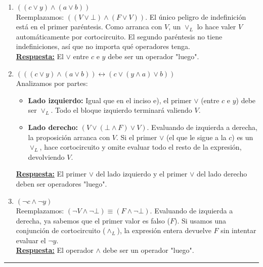 \begin{enumerate}[label=\textbf{\alph*)}]
    \vspace{0.4cm}
    \item \textbf{$((c \vee y) \wedge (a \vee b))$} \\
    Reemplazamos: $((V \vee \bot) \wedge (F \vee V))$. El único peligro de indefinición está en el primer paréntesis. Como arranca con $V$, un $\vee_L$ lo hace valer $V$ automáticamente por cortocircuito. El segundo paréntesis no tiene indefiniciones, así que no importa qué operadores tenga. \\
    \underline{\textbf{Respuesta:}} El $\vee$ entre $c$ e $y$ debe ser un operador "luego".

    \vspace{0.4cm}
    \item \textbf{$(((c \vee y) \wedge (a \vee b)) \leftrightarrow (c \vee (y \wedge a) \vee b))$} \\
    Analizamos por partes:
    \begin{itemize}
        \item \textbf{Lado izquierdo:} Igual que en el inciso e), el primer $\vee$ (entre $c$ e $y$) debe ser $\vee_L$. Todo el bloque izquierdo terminará valiendo $V$.
        \item \textbf{Lado derecho:} $(V \vee (\bot \wedge F) \vee V)$. Evaluando de izquierda a derecha, la proposición arranca con $V$. Si el primer $\vee$ (el que le sigue a la $c$) es un $\vee_L$, hace cortocircuito y omite evaluar todo el resto de la expresión, devolviendo $V$.
    \end{itemize}
    \underline{\textbf{Respuesta:}} El primer $\vee$ del lado izquierdo y el primer $\vee$ del lado derecho deben ser operadores "luego".

    \vspace{0.4cm}
    \item \textbf{$(\neg c \wedge \neg y)$} \\
    Reemplazamos: $(\neg V \wedge \neg \bot) \equiv (F \wedge \neg \bot)$. Evaluando de izquierda a derecha, ya sabemos que el primer valor es falso ($F$). Si usamos una conjunción de cortocircuito ($\wedge_L$), la expresión entera devuelve $F$ sin intentar evaluar el $\neg y$. \\
    \underline{\textbf{Respuesta:}} El operador $\wedge$ debe ser un operador "luego".

\end{enumerate}

\vspace{0.5cm}
\hrule
\vspace{0.5cm}